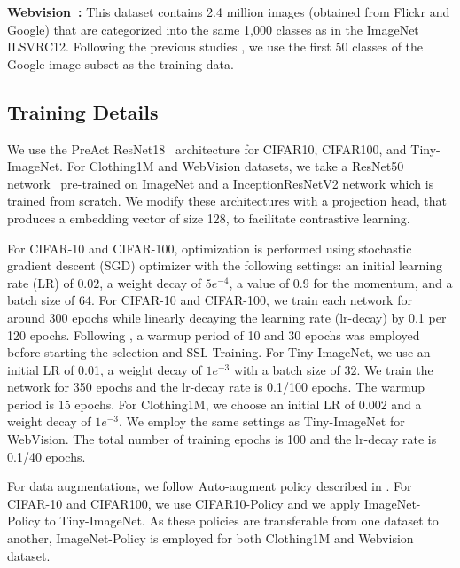 \documentclass[10pt,twocolumn,letterpaper]{article}
\begin{document}
\textbf{Webvision~\cite{li2017webvision}:} This dataset contains 2.4 million images (obtained from Flickr and Google)
that are categorized into the same 1,000 classes as in the ImageNet ILSVRC12. 
Following the previous studies \cite{li2020dividemix, nishi2021augmentation}, we use the first 50 classes of the Google image subset as the training data. 

\subsection{Training Details}
We use the PreAct ResNet18~\cite{he2016deep} architecture for CIFAR10, CIFAR100, and Tiny-ImageNet. For Clothing1M and WebVision datasets, we take a ResNet50 network~\cite{he2016deep} pre-trained on ImageNet and a InceptionResNetV2 network \cite{szegedy2017inception} which is trained from scratch. We modify these architectures with a projection head, that produces a embedding vector of size 128,  to facilitate contrastive learning.


For CIFAR-10 and CIFAR-100, optimization is performed using stochastic gradient descent (SGD) optimizer with the following settings:  an initial learning rate (LR) of $0.02$, a weight decay of $5e^{-4}$, a value of 0.9 for the momentum, and a batch size of $64$. For CIFAR-10 and CIFAR-100, we train each network for around 300 epochs while linearly decaying the learning rate (lr-decay) by 0.1 per 120 epochs. Following \cite{li2020dividemix}, a warmup period of 10 and 30 epochs was employed before starting the selection and SSL-Training. 
For Tiny-ImageNet, we use an initial LR of 0.01, a weight decay of $1e^{-3}$ with a batch size of $32$. We train the network for 350 epochs and the lr-decay rate is 0.1/100 epochs. The warmup period is 15 epochs. 
For Clothing1M, we choose an initial LR of 0.002 and a weight decay of $1e^{-3}$. We employ the same settings as Tiny-ImageNet for WebVision. The total number of training epochs is 100 and the lr-decay rate is 0.1/40 epochs. 

For data augmentations, we follow Auto-augment policy described in \cite{cubuk2019autoaugment}. For CIFAR-10 and CIFAR100, we use CIFAR10-Policy and we apply ImageNet-Policy to Tiny-ImageNet. As these policies are transferable from one dataset to another, ImageNet-Policy is employed for both Clothing1M and Webvision dataset.
\end{document}
